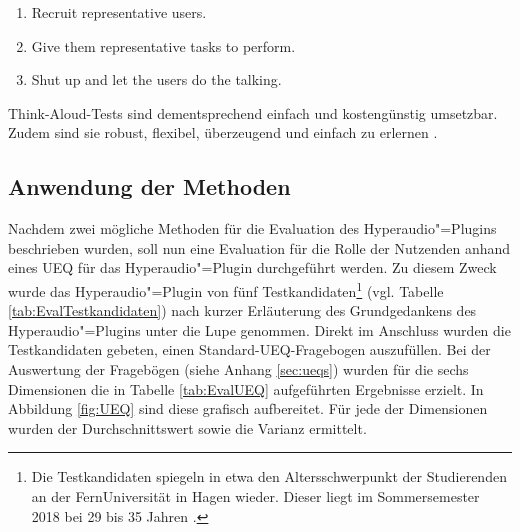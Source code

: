 \begin{enumerate}
\item Recruit representative users.
\item Give them representative tasks to perform.
\item Shut up and let the users do the talking.
\end{enumerate}

Think-Aloud-Tests sind dementsprechend einfach und kostengünstig umsetzbar. Zudem sind sie robust, flexibel, überzeugend und einfach zu erlernen \citep{nielsen2012thinking}.

\subsection{Anwendung der Methoden}
Nachdem zwei mögliche Methoden für die Evaluation des Hyperaudio"=Plugins beschrieben wurden, soll nun eine Evaluation für die Rolle der Nutzenden anhand eines UEQ für das Hyperaudio"=Plugin durchgeführt werden. Zu diesem Zweck wurde das Hyperaudio"=Plugin von fünf Testkandidaten\footnote{Die Testkandidaten spiegeln in etwa den Altersschwerpunkt der Studierenden an der FernUniversität in Hagen wieder. Dieser liegt im Sommersemester 2018 bei 29 bis 35 Jahren \citep{fernuniversitaet2018stat}.} (vgl. Tabelle \ref{tab:EvalTestkandidaten}) nach kurzer Erläuterung des Grundgedankens des Hyperaudio"=Plugins unter die Lupe genommen. Direkt im Anschluss wurden die Testkandidaten gebeten, einen Standard-UEQ-Fragebogen auszufüllen. Bei der Auswertung der Fragebögen (siehe Anhang \ref{sec:ueqs}) wurden für die sechs Dimensionen die in Tabelle \ref{tab:EvalUEQ} aufgeführten Ergebnisse erzielt. In Abbildung \ref{fig:UEQ} sind diese grafisch aufbereitet. Für jede der Dimensionen wurden der Durchschnittswert sowie die Varianz ermittelt.

\begin{table}[!ht]
\def\arraystretch{1.4}
    \caption{Demografische Daten der Testkandidaten}
\label{tab:EvalTestkandidaten}
\end{table}


